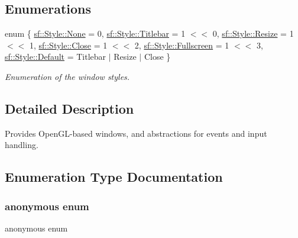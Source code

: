 \subsection*{Enumerations}
\begin{DoxyCompactItemize}
\item 
enum \{ \newline
\mbox{\hyperlink{group__window_gga97d7ee508bea4507ab40271518c732ffa8c35a9c8507559e455387fc4a83ce422}{sf\+::\+Style\+::\+None}} = 0, 
\mbox{\hyperlink{group__window_gga97d7ee508bea4507ab40271518c732ffab4c8b32b05ed715928513787cb1e85b6}{sf\+::\+Style\+::\+Titlebar}} = 1 $<$$<$ 0, 
\mbox{\hyperlink{group__window_gga97d7ee508bea4507ab40271518c732ffaccff967648ebcd5db2007eff7352b50f}{sf\+::\+Style\+::\+Resize}} = 1 $<$$<$ 1, 
\mbox{\hyperlink{group__window_gga97d7ee508bea4507ab40271518c732ffae07a7d411d5acf28f4a9a4b76a3a9493}{sf\+::\+Style\+::\+Close}} = 1 $<$$<$ 2, 
\newline
\mbox{\hyperlink{group__window_gga97d7ee508bea4507ab40271518c732ffa6288ec86830245cf957e2d234f79f50d}{sf\+::\+Style\+::\+Fullscreen}} = 1 $<$$<$ 3, 
\mbox{\hyperlink{group__window_gga97d7ee508bea4507ab40271518c732ffa5597cd420fc461807e4a201c92adea37}{sf\+::\+Style\+::\+Default}} = Titlebar $\vert$ Resize $\vert$ Close
 \}
\begin{DoxyCompactList}\small\item\em Enumeration of the window styles. \end{DoxyCompactList}\end{DoxyCompactItemize}


\subsection{Detailed Description}
Provides Open\+G\+L-\/based windows, and abstractions for events and input handling. \begin{DoxyVerb}\end{DoxyVerb}
 

\subsection{Enumeration Type Documentation}
\mbox{\label{group__window_ga97d7ee508bea4507ab40271518c732ff}} 
\subsubsection{\texorpdfstring{anonymous enum}{anonymous enum}}
{\footnotesize\ttfamily anonymous enum}



